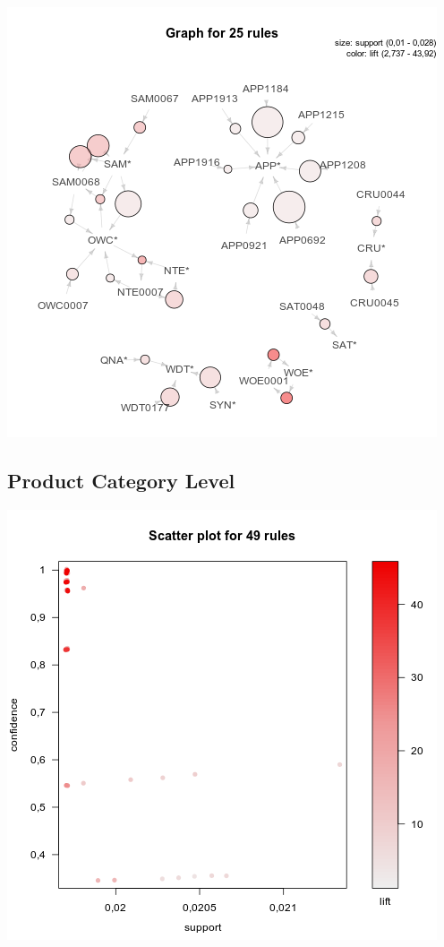 \documentclass[12pt,a4paper,leqno]{report}
\theoremstyle{plain}
\theoremstyle{definition}
\theoremstyle{remark}
\begin{document}
\bigskip
{
    \centering
    \includegraphics[width=\textwidth,height=\textheight,keepaspectratio]{apriori_brand_level_graph.png}
    \par
}
\bigskip


\subsection{Product Category Level}

\bigskip
{
    \centering
    \includegraphics[width=\textwidth,height=\textheight,keepaspectratio]{apriori_product_category_level_plot.png}
    \par
}
\bigskip
\end{document}
